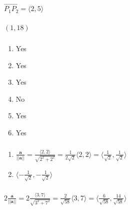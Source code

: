 \documentclass{article}
\begin{document}
$\overrightarrow{P_1 P_2} = \langle 2, 5 \rangle$

\setcounter{subsubsection}{18}
\subsubsection{}

$(1, 18)$

\setcounter{subsubsection}{20}
\subsubsection{}

\begin{enumerate}
  \item Yes

  \item Yes

  \item Yes

  \item No

  \item Yes

  \item Yes
\end{enumerate}

\setcounter{subsubsection}{24}
\subsubsection{}

\begin{enumerate}
  \item $\frac{\mathbf{a}}{||\mathbf{a}||} = \frac{\langle 2, 2 \rangle}{\sqrt{2^2 + 2^2}} = \frac{1}{2 \sqrt{2}} \langle 2, 2 \rangle = \langle \frac{1}{\sqrt{2}}, \frac{1}{\sqrt{2}} \rangle$

  \item $\langle -\frac{1}{\sqrt{2}}, -\frac{1}{\sqrt{2}} \rangle$
\end{enumerate}

\setcounter{subsubsection}{30}
\subsubsection{}

$2 \frac{\mathbf{a}}{||\mathbf{a}||} = 2 \frac{\langle 3, 7 \rangle}{\sqrt{3^2 + 7^2}} = \frac{2}{\sqrt{58}} \langle 3, 7 \rangle = \langle \frac{6}{\sqrt{58}}, \frac{14}{\sqrt{58}} \rangle$

\setcounter{subsubsection}{36}
\end{document}
